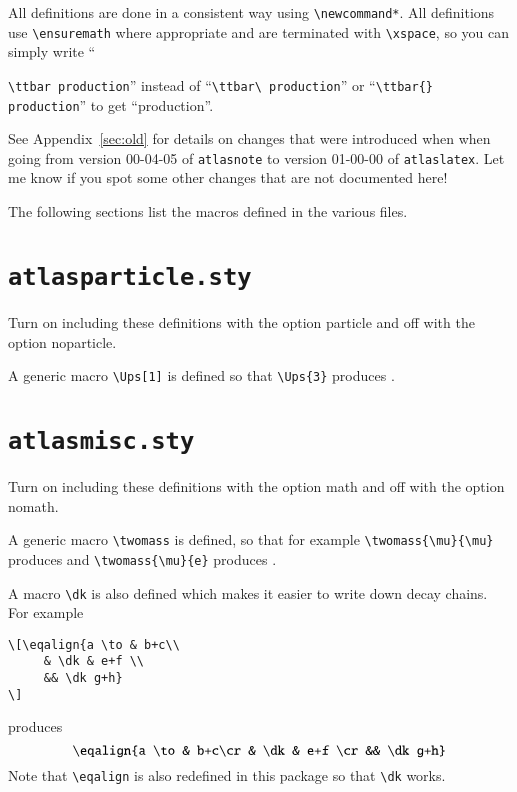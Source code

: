 \documentclass[UKenglish]{style/atlasdoc}
\newcommand{\File}[1]{\texttt{#1}\xspace}
\newcommand{\Macro}[1]{\texttt{\textbackslash #1}\xspace}
\newcommand{\Option}[1]{\textsf{#1}\xspace}
\newcommand{\Package}[1]{\texttt{#1}\xspace}
\begin{document}
All definitions are done in a consistent way using \verb|\newcommand*|.
All definitions use \verb|\ensuremath| where appropriate and are terminated with
\verb|\xspace|, so you can simply write ``{\verb|\ttbar production|'' instead of
``\verb|\ttbar\ production|'' or ``\verb|\ttbar{} production|'' to get \enquote{\ttbar production}.

See Appendix~\ref{sec:old} for details on changes that were introduced when
when going from version 00-04-05 of \Package{atlasnote}
to version 01-00-00 of \Package{atlaslatex}.
Let me know if you spot some other changes that are not documented here!

The following sections list the macros defined in the various files.

\twocolumn
\section{\File{atlasparticle.sty}}

Turn on including these definitions with the option \Option{particle} and off with the option \Option{noparticle}.



A generic macro \verb|\Ups[1]| is defined so that \verb|\Ups{3}| produces .


\section{\File{atlasmisc.sty}}

Turn on including these definitions with the option \Option{math} and off with the option \Option{nomath}.



\noindent A generic macro \verb|\twomass| is defined, so that for example
\verb|\twomass{\mu}{\mu}| produces \twomass{\mu}{\mu} and \verb|\twomass{\mu}{e}| produces .

A macro \verb|\dk| is also defined which makes it easier to write down decay chains.
For example
\begin{verbatim}
\[\eqalign{a \to & b+c\\
	 & \dk & e+f \\
	 && \dk g+h}
\]
\end{verbatim}
produces
\[\eqalign{a \to & b+c\cr
	 & \dk & e+f \cr
	 && \dk g+h}
\]
Note that \Macro{eqalign} is also redefined in this package so that \Macro{dk} works.


}
\end{document}
